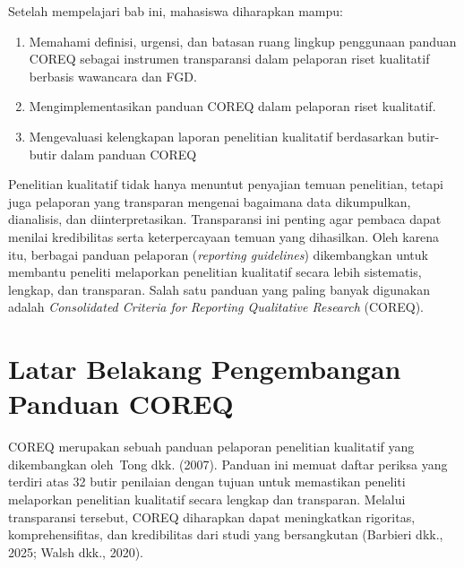 \documentclass[
  indonesian,
  letterpaper,
  DIV=11,
  numbers=noendperiod]{scrreprt}
\providecommand{\tightlist}{%
  \setlength{\itemsep}{0pt}\setlength{\parskip}{0pt}}
\begin{document}
\begin{tcolorbox}[enhanced jigsaw, colframe=quarto-callout-note-color-frame, toptitle=1mm, breakable, leftrule=.75mm, arc=.35mm, toprule=.15mm, colback=white, colbacktitle=quarto-callout-note-color!10!white, bottomtitle=1mm, bottomrule=.15mm, titlerule=0mm, title=\textcolor{quarto-callout-note-color}{\faInfo}\hspace{0.5em}{Capaian Pembelajaran}, coltitle=black, left=2mm, opacitybacktitle=0.6, opacityback=0, rightrule=.15mm]

Setelah mempelajari bab ini, mahasiswa diharapkan mampu:

\begin{enumerate}
\def\labelenumi{\arabic{enumi}.}
\tightlist
\item
  Memahami definisi, urgensi, dan batasan ruang lingkup penggunaan
  panduan COREQ sebagai instrumen transparansi dalam pelaporan riset
  kualitatif berbasis wawancara dan FGD.
\item
  Mengimplementasikan panduan COREQ dalam pelaporan riset kualitatif.
\item
  Mengevaluasi kelengkapan laporan penelitian kualitatif berdasarkan
  butir-butir dalam panduan COREQ
\end{enumerate}

\end{tcolorbox}

Penelitian kualitatif tidak hanya menuntut penyajian temuan penelitian,
tetapi juga pelaporan yang transparan mengenai bagaimana data
dikumpulkan, dianalisis, dan diinterpretasikan. Transparansi ini penting
agar pembaca dapat menilai kredibilitas serta keterpercayaan temuan yang
dihasilkan. Oleh karena itu, berbagai panduan pelaporan (\emph{reporting
guidelines}) dikembangkan untuk membantu peneliti melaporkan penelitian
kualitatif secara lebih sistematis, lengkap, dan transparan. Salah satu
panduan yang paling banyak digunakan adalah \emph{Consolidated Criteria
for Reporting Qualitative Research} (COREQ).

\section{Latar Belakang Pengembangan Panduan
COREQ}\label{latar-belakang-pengembangan-panduan-coreq}

COREQ merupakan sebuah panduan pelaporan penelitian kualitatif yang
dikembangkan oleh~Tong dkk. (2007). Panduan ini memuat daftar periksa
yang terdiri atas 32 butir penilaian dengan tujuan untuk memastikan
peneliti melaporkan penelitian kualitatif secara lengkap dan transparan.
Melalui transparansi tersebut, COREQ diharapkan dapat meningkatkan
rigoritas, komprehensifitas, dan kredibilitas dari studi yang
bersangkutan (Barbieri dkk., 2025; Walsh dkk., 2020).
\end{document}
